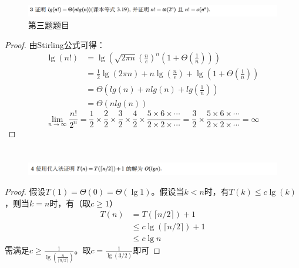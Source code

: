 \documentclass[]{report}
\begin{document}
    \section{}%
    \begin{figure}[h!]
      \centering
      \includegraphics[scale=0.3]{images/Pro_3.png}
      \caption{第三题题目}
    \end{figure}
    \begin{proof}
      由Stirling公式可得：
      \[\begin{aligned}
        \lg(n!)&=\lg\left(\sqrt{2\pi n}\left(\frac{n}{e}\right)^n\left(1+\Theta\left(\frac{1}{n}\right)\right)\right)\\
        &=\frac{1}{2}\lg(2\pi n)+n\lg\left(\frac{n}{e}\right)+\lg\left(1+\Theta\left(\frac{1}{n}\right)\right)\\
        &=\Theta\left(lg(n)+nlg(n)+lg\left(\frac{1}{n}\right)\right)\\
        &=\Theta(nlg(n))
      \end{aligned}
      \]
      \[\lim_{n\to\infty}\frac{n!}{2^n}=\frac{1}{2}\times\frac{2}{2}\times\frac{3}{2}\times\frac{4}{2}\times\frac{5\times6\times\cdots}{2\times2\times\cdots}=\frac{3}{2}\times\frac{5\times6\times\cdots}{2\times2\times\cdots}=\infty
      \]
    \end{proof}

    \section{}%
    \begin{figure}[h]
      \centering
      \includegraphics[scale=0.3]{images/Pro_4.png}
    \end{figure}
    \begin{proof}
      假设$T(1)=\Theta(0)=\Theta(\lg1)$。假设当$k<n$时，有$T(k)\le c\lg(k)$，则当$k=n$时，有（取$c\ge1$）
      \[\begin{aligned}
        T(n)&=T(\lceil n/2\rceil)+1\\
        &\le c\lg(\lceil n/2\rceil)+1\\
        &\le c\lg n
      \end{aligned}
      \]需满足$\displaystyle c\ge\frac{1}{\lg(\frac{n}{\lceil n/2\rceil})}$。取$c=\frac{1}{\lg(3/2)}$即可
    \end{proof}\newpage
\end{document}
